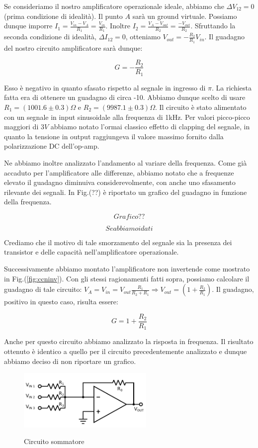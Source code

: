 Se consideriamo il nostro amplificatore operazionale ideale, abbiamo che $\Delta V_{12}=0$ (prima condizione di idealità).
Il punto $A$ sarà un ground virtuale.
Possiamo dunque imporre $I_1=\frac{V_{in}-V_A}{R_1}=\frac{V_{in}}{R_1}$.
Inoltre $I_2=\frac{V_A-V_{out}}{R_2}=\frac{-V_{out}}{R_2}$.
Sfruttando la seconda condizione di idealità, $\Delta I_{12}=0$, otteniamo $V_{out}=-\frac{R_2}{R_1} V_{in}$.
Il guadagno del nostro circuito amplificatore sarà dunque:

$$G=-\frac{R_2}{R_1}$$

Esso è negativo in quanto sfasato rispetto al segnale in ingresso di $\pi$.
La richiesta fatta era di ottenere un guadagno di circa -10.
Abbiamo dunque scelto di usare $R_1=(1001.6\pm0.3)\Omega$ e $R_2=(9987.1\pm0.3)\Omega$.
Il circuito è stato alimentato con un segnale in input sinusoidale alla frequenza di 1kHz.
Per valori picco-picco maggiori di $3V$ abbiamo notato l'ormai classico effetto di clapping del segnale, in quanto la tensione in output raggiungeva il valore massimo fornito dalla polarizzazione DC dell'op-amp. 

Ne abbiamo inoltre analizzato l'andamento al variare della frequenza.
Come già accaduto per l'amplificatore alle differenze, abbiamo notato che a frequenze elevato il guadagno diminuiva considerevolmente, con anche uno sfasamento rilevante dei segnali.
In Fig.(??) è riportato un grafico del guadagno in funzione della frequenza. 

$$Grafico??$$

$$Se abbiamo i dati$$


Crediamo che il motivo di tale smorzamento del segnale sia la presenza dei transistor e delle capacità nell'amplificatore operazionale.


Successivamente abbiamo montato l'amplificatore non invertende come mostrato in Fig.(\ref{fig:ccninv}). Con gli stessi ragionamenti fatti sopra, possiamo calcolare il guadagno di tale circuito: $V_A=V_{in}=V_{out}\frac{R_1}{R_2+R_1} \Rightarrow V_{out}=(1+\frac{R_2}{R_1})$. Il guadagno, positivo in questo caso, risulta essere: 

$$G=1+\frac{R_2}{R_1}$$

Anche per questo circuito abbiamo analizzato la risposta in frequenza.
Il risultato ottenuto è identico a quello per il circuito precedentemente analizzato e dunque abbiamo deciso di non riportare un grafico.

\begin{figure}
	\caption{Circuito sommatore}
	\includegraphics[width=65mm]{ccsum.pdf}
	\label{fig:ccsum}
\end{figure}

